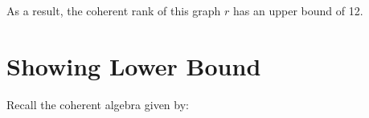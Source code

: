 \documentclass{article}
\begin{document}
As a result, the coherent rank of this graph $r$ has an upper bound of 12.

\section{Showing Lower Bound}
Recall the coherent algebra given by:

\end{document}
